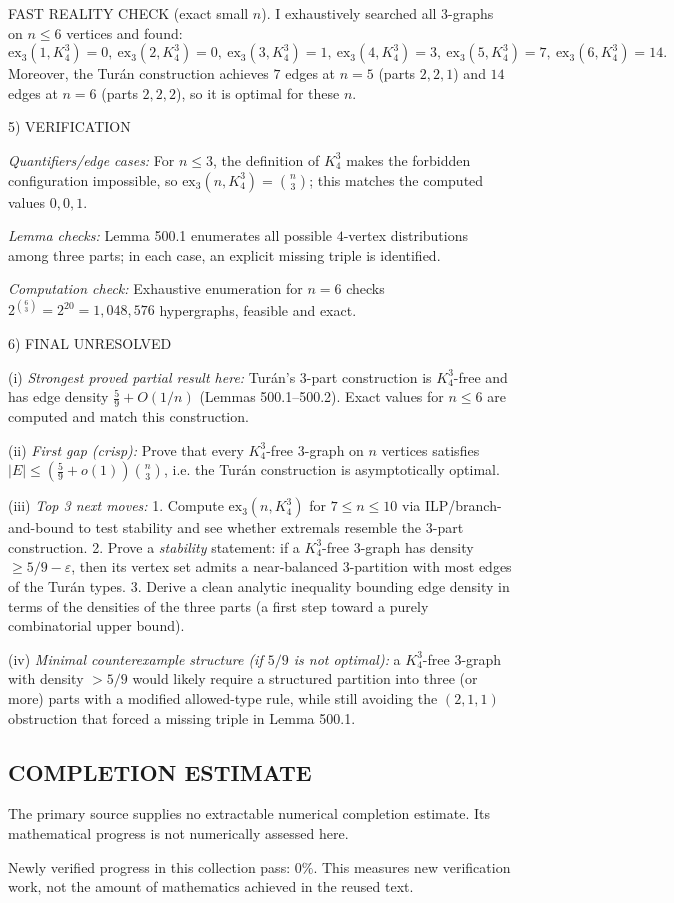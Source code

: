 FAST REALITY CHECK (exact small $n$).
I exhaustively searched all $3$-graphs on $n\le 6$ vertices and found:
\[
\mathrm{ex}_3(1,K_4^3)=0,\ \mathrm{ex}_3(2,K_4^3)=0,\ \mathrm{ex}_3(3,K_4^3)=1,\ \mathrm{ex}_3(4,K_4^3)=3,\ \mathrm{ex}_3(5,K_4^3)=7,\ \mathrm{ex}_3(6,K_4^3)=14.
\]
Moreover, the Tur\'an construction achieves $7$ edges at $n=5$ (parts $2,2,1$) and $14$ edges at $n=6$ (parts $2,2,2$), so it is optimal for these $n$.

5) VERIFICATION

\emph{Quantifiers/edge cases:} For $n\le 3$, the definition of $K_4^3$ makes the forbidden configuration impossible, so $\mathrm{ex}_3(n,K_4^3)=\binom{n}{3}$; this matches the computed values $0,0,1$.

\emph{Lemma checks:} Lemma 500.1 enumerates all possible $4$-vertex distributions among three parts; in each case, an explicit missing triple is identified.

\emph{Computation check:} Exhaustive enumeration for $n=6$ checks $2^{\binom{6}{3}}=2^{20}=1{,}048{,}576$ hypergraphs, feasible and exact.

6) FINAL
UNRESOLVED

(i) \emph{Strongest proved partial result here:} Tur\'an's 3-part construction is $K_4^3$-free and has edge density $\frac{5}{9}+O(1/n)$ (Lemmas 500.1--500.2). Exact values for $n\le 6$ are computed and match this construction.

(ii) \emph{First gap (crisp):} Prove that every $K_4^3$-free $3$-graph on $n$ vertices satisfies $\lvert E\rvert \le \left(\frac{5}{9}+o(1)\right)\binom{n}{3}$, i.e. the Tur\'an construction is asymptotically optimal.

(iii) \emph{Top 3 next moves:}
1. Compute $\mathrm{ex}_3(n,K_4^3)$ for $7\le n\le 10$ via ILP/branch-and-bound to test stability and see whether extremals resemble the 3-part construction.
2. Prove a \emph{stability} statement: if a $K_4^3$-free $3$-graph has density $\ge 5/9-\varepsilon$, then its vertex set admits a near-balanced 3-partition with most edges of the Tur\'an types.
3. Derive a clean analytic inequality bounding edge density in terms of the densities of the three parts (a first step toward a purely combinatorial upper bound).

(iv) \emph{Minimal counterexample structure (if $5/9$ is not optimal):} a $K_4^3$-free $3$-graph with density $>5/9$ would likely require a structured partition into three (or more) parts with a modified allowed-type rule, while still avoiding the $(2,1,1)$ obstruction that forced a missing triple in Lemma 500.1.




\subsection*{COMPLETION ESTIMATE}
The primary source supplies no extractable numerical completion estimate. Its mathematical progress is not numerically assessed here.

Newly verified progress in this collection pass: $0\%$. This measures new verification work, not the amount of mathematics achieved in the reused text.
